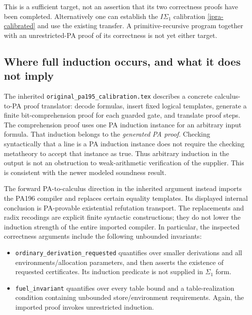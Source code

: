 This is a sufficient target, not an assertion that its two correctness
proofs have been completed.  Alternatively one can establish the
$I\Sigma_1$ calibration \eqref{ipra-calibrated} and use the existing
transfer.  A primitive-recursive program together with an unrestricted-PA
proof of its correctness is not yet either target.

\subsection{Where full induction occurs, and what it does not imply}
\label{ipra-induction-audit}

The inherited \texttt{original\_pa195\_calibration.tex} describes a concrete
calculus-to-PA proof translator: decode formulas, insert fixed logical
templates, generate a finite bit-comprehension proof for each guarded
gate, and translate proof steps.  The comprehension proof uses one PA
induction instance for an arbitrary input formula.  That induction belongs
to the \emph{generated PA proof}.  Checking syntactically that a line is
a PA induction instance does not require the checking metatheory to accept
that instance as true.  Thus arbitrary induction in the output is not an
obstruction to weak-arithmetic verification of the supplier.  This is
consistent with the newer modeled soundness result.\cite{pa194-modeled}

The forward PA-to-calculus direction in the inherited argument instead
imports the PA196 compiler and replaces certain equality templates.  Its
displayed internal conclusion is PA-provable existential refutation
transport.  The replacements and radix recodings are explicit finite
syntactic constructions; they do not lower the induction strength of the
entire imported compiler.  In particular, the inspected correctness
arguments include the following unbounded invariants:\cite{fullpa-audit}
\begin{itemize}
 \item \texttt{ordinary\_derivation\_requested} quantifies over smaller
 derivations and all environments/allocation parameters, and then asserts
 the existence of requested certificates.  Its induction predicate is not
 supplied in $\Sigma_1$ form.
 \item \texttt{fuel\_invariant} quantifies over every table bound and a
 table-realization condition containing unbounded store/environment
 requirements.  Again, the imported proof invokes unrestricted induction.
\end{itemize}

